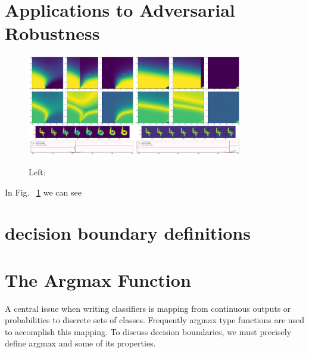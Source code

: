 \section{Applications to Adversarial Robustness}

\begin{figure}[ht!]
    \centering
    \includegraphics[width=0.42\textwidth]{c5_figures/stab-mnist-C32-50-50-10-0.001-eval-1e-06-none-4-6-db_interp-stability-50.png}\includegraphics[width=0.42\textwidth]{c5_figures/stab-mnist-C32-50-50-10-0.001-eval-1e-06-pgd-4-6-db_interp-stability-50.png}

    \caption{Left: 	}
    \label{fig:wedge_db}
\end{figure}


In Fig. ~\ref{fig:wedge_db} we can see 

\section{decision boundary definitions} 
\section{The Argmax Function}

A central issue when writing classifiers is mapping from continuous outputs or probabilities to discrete sets of classes. Frequently argmax type functions are used to accomplish this mapping. To discuss decision boundaries, we must precisely define argmax and some of its properties. 

